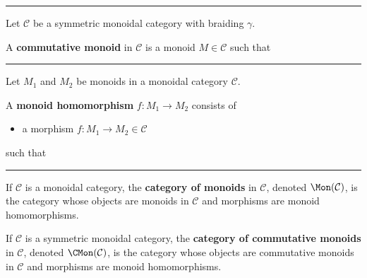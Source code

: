 \documentclass[12pt]{article}
\newcommand{\keyword}[1]{\textbf{#1}}
\newcommand{\sepline}{\rule{\textwidth}{0.4pt}}
\newenvironment{cd}{\begin{center}\begin{tikzcd}}{\end{tikzcd}\end{center}}
\theoremstyle{definition}
\newcommand{\CC}{\mathcal{C}}
\newcommand{\<}{\left\langle}
\renewcommand{\>}{\right\rangle}
\newcommand{\tensor}{\otimes}
\renewcommand{\_}[1]{{_{#1}}}
\begin{document}
\sepline

Let $\CC$ be a symmetric monoidal category with braiding $\gamma$.

A \keyword{commutative monoid} in $\CC$ is a monoid $M \in \CC$ such that

\sepline

Let $M_1$ and $M_2$ be monoids in a monoidal category $\CC$.

A \keyword{monoid homomorphism} $f : M_1 \to M_2$ consists of 
\begin{itemize}
    \item a morphism $f : M_1 \to M_2 \in \CC$
\end{itemize}
such that

\sepline

If $\CC$ is a monoidal category, the \keyword{category of monoids} in $\CC$, denoted $\Mon(\CC)$, is the category whose objects are monoids in $\CC$ and morphisms are monoid homomorphisms.

If $\CC$ is a symmetric monoidal category, the \keyword{category of commutative monoids} in $\CC$, denoted $\CMon(\CC)$, is the category whose objects are commutative monoids in $\CC$ and morphisms are monoid homomorphisms.
\end{document}
